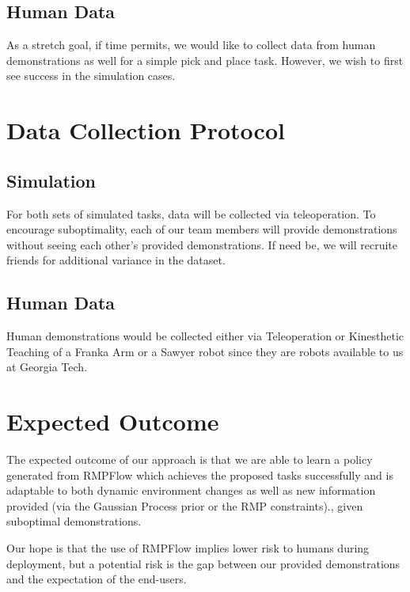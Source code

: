 \subsection{Human Data}

As a stretch goal, if time permits, we would like to collect data from human demonstrations as well for a simple pick and place task. However, we wish to first see success in the simulation cases.


\section{Data Collection Protocol}

\subsection{Simulation}

For both sets of simulated tasks, data will be collected via teleoperation. To encourage suboptimality, each of our team members will provide demonstrations without seeing each other's provided demonstrations. If need be, we will recruite friends for additional variance in the dataset.

\subsection{Human Data}

Human demonstrations would be collected either via Teleoperation or Kinesthetic Teaching of a Franka Arm or a Sawyer robot since they are robots available to us at Georgia Tech.


\section{Expected Outcome}

The expected outcome of our approach is that we are able to learn a policy generated from RMPFlow which achieves the proposed tasks successfully and is adaptable to both dynamic environment changes as well as new information provided (via the Gaussian Process prior or the RMP constraints)., given suboptimal demonstrations.

Our hope is that the use of RMPFlow implies lower risk to humans during deployment, but a potential risk is the gap between our provided demonstrations and the expectation of the end-users.

